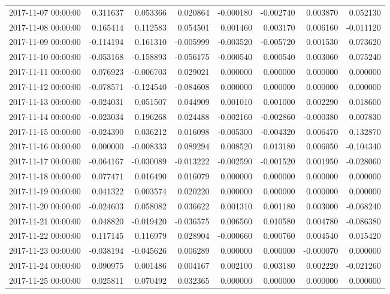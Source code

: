 \begin{tabular}{lrrrrrrr}
2017-11-07 00:00:00 & 0.311637 & 0.053366 & 0.020864 & -0.000180 & -0.002740 & 0.003870 & 0.052130 \\
2017-11-08 00:00:00 & 0.165414 & 0.112583 & 0.054501 & 0.001460 & 0.003170 & 0.006160 & -0.011120 \\
2017-11-09 00:00:00 & -0.114194 & 0.161310 & -0.005999 & -0.003520 & -0.005720 & 0.001530 & 0.073620 \\
2017-11-10 00:00:00 & -0.053168 & -0.158893 & -0.056175 & -0.000540 & 0.000540 & 0.003060 & 0.075240 \\
2017-11-11 00:00:00 & 0.076923 & -0.006703 & 0.029021 & 0.000000 & 0.000000 & 0.000000 & 0.000000 \\
2017-11-12 00:00:00 & -0.078571 & -0.124540 & -0.084608 & 0.000000 & 0.000000 & 0.000000 & 0.000000 \\
2017-11-13 00:00:00 & -0.024031 & 0.051507 & 0.044909 & 0.001010 & 0.001000 & 0.002290 & 0.018600 \\
2017-11-14 00:00:00 & -0.023034 & 0.196268 & 0.024488 & -0.002160 & -0.002860 & -0.000380 & 0.007830 \\
2017-11-15 00:00:00 & -0.024390 & 0.036212 & 0.016098 & -0.005300 & -0.004320 & 0.006470 & 0.132870 \\
2017-11-16 00:00:00 & 0.000000 & -0.008333 & 0.089294 & 0.008520 & 0.013180 & 0.006050 & -0.104340 \\
2017-11-17 00:00:00 & -0.064167 & -0.030089 & -0.013222 & -0.002590 & -0.001520 & 0.001950 & -0.028060 \\
2017-11-18 00:00:00 & 0.077471 & 0.016490 & 0.016079 & 0.000000 & 0.000000 & 0.000000 & 0.000000 \\
2017-11-19 00:00:00 & 0.041322 & 0.003574 & 0.020220 & 0.000000 & 0.000000 & 0.000000 & 0.000000 \\
2017-11-20 00:00:00 & -0.024603 & 0.058082 & 0.036622 & 0.001310 & 0.001180 & 0.003000 & -0.068240 \\
2017-11-21 00:00:00 & 0.048820 & -0.019420 & -0.036575 & 0.006560 & 0.010580 & 0.004780 & -0.086380 \\
2017-11-22 00:00:00 & 0.117145 & 0.116979 & 0.028904 & -0.000660 & 0.000760 & 0.004540 & 0.015420 \\
2017-11-23 00:00:00 & -0.038194 & -0.045626 & 0.006289 & 0.000000 & 0.000000 & -0.000070 & 0.000000 \\
2017-11-24 00:00:00 & 0.090975 & 0.001486 & 0.004167 & 0.002100 & 0.003180 & 0.002220 & -0.021260 \\
2017-11-25 00:00:00 & 0.025811 & 0.070492 & 0.032365 & 0.000000 & 0.000000 & 0.000000 & 0.000000 \\

\end{tabular}
